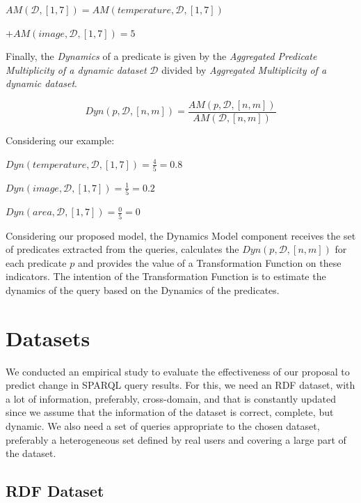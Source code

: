\documentclass[runningheads]{llncs}
\begin{document}
\begin{example}
	\label{ex:am}
	$AM(\mathcal{D},[1,7]) = AM(temperature, \mathcal{D},[1,7])$
	
	$+ AM(image, \mathcal{D},[1,7]) = 5$
\end{example}

Finally, the \textit{Dynamics} of a predicate is given by the \textit{Aggregated Predicate Multiplicity of a dynamic dataset} $\mathcal{D}$ divided by \textit{Aggregated Multiplicity of a dynamic dataset}.

\begin{equation}
\label{eq:dyn}
Dyn(p, \mathcal{D},[n,m]) = \frac{AM(p, \mathcal{D},[n,m])}{AM(\mathcal{D},[n,m])}
\end{equation}

\begin{example}
	\label{ex:dyn}
	Considering our example:
	
	$ Dyn(temperature, \mathcal{D},[1,7]) = \frac{4}{5} = 0.8$
	
	$ Dyn(image, \mathcal{D},[1,7]) = \frac{1}{5} = 0.2$
	
	$ Dyn(area, \mathcal{D},[1,7]) = \frac{0}{5} = 0$
\end{example}

Considering our proposed model, the Dynamics Model component receives the set of predicates extracted from the queries, calculates the $Dyn(p, \mathcal{D},[n,m])$ for each predicate $p$ and provides the value of a Transformation Function on these indicators. The intention of the Transformation Function is to estimate the dynamics of the query based on the Dynamics of the predicates.


\section{Datasets}
\label{sec:data}

We conducted an empirical study to evaluate the effectiveness of our proposal to predict change in SPARQL query results. For this, we need an RDF dataset, with a lot of information, preferably, cross-domain, and that is constantly updated since we assume that the information of the dataset is correct, complete, but dynamic. We also need a set of queries appropriate to the chosen dataset, preferably a heterogeneous set defined by real users and covering a large part of the dataset.

\subsection{RDF Dataset}
\end{document}
